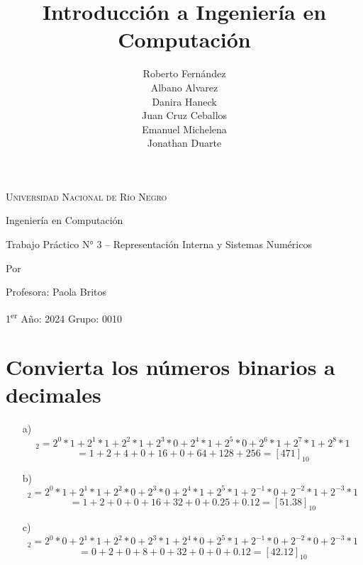 \documentclass{article}
\title{Introducción a Ingeniería en Computación}
\author{Roberto Fernández \\ Albano Alvarez \\ Danira Haneck \\ Juan Cruz Ceballos \\ Emanuel Michelena \\ Jonathan Duarte}
\date{}
\newcommand{\unrn}{\textsc{Universidad Nacional de Río Negro}}
\newcommand{\curso}{1\textsuperscript{er} Año: 2024 Grupo: 0010}
\newcommand{\profesor}{Profesora: Paola Britos}
\newcommand{\paperdesc}{Trabajo Práctico N° 3 – Representación Interna y Sistemas Numéricos}
\begin{document}
\begin{titlingpage}
    \begin{center}
        \vspace*{2cm}
        {\LARGE \unrn \par}
        \vspace{0.5cm}
        {\Large Ingeniería en Computación \par}
        \vspace{1.5cm}
        {\Large \thetitle \par}
        \vspace{1.5cm}
        {\Large \paperdesc \par}
        \vspace{2cm}
        {\Large Por \par}
        \vspace{0.5cm}
        {\large \theauthor \par}
        \vspace{2cm}
        {\Large \profesor \par}
        \vspace{0.5cm}
        {\Large \curso \par}
    \end{center}
\end{titlingpage}

\section{Convierta los números binarios a decimales}

\begin{enumerate}
    \item[a)] \begin{equation*} [111010111]_{2} = 2^{0} * 1 + 2^{1} * 1 + 2^{2} * 1 + 2^{3} * 0 + 2^{4} * 1 + 2^{5} * 0 + 2^{6} * 1 + 2^{7} * 1 + 2^{8} * 1\end{equation*} \begin{equation*} = 1 + 2 + 4 + 0 + 16 + 0 + 64 + 128 + 256 = [471]_{10}\end{equation*}
    \item[b)]  \begin{equation*} [110011.011]_{2} = 2^{0} * 1 + 2^{1} * 1 + 2^{2} * 0 + 2^{3} * 0 + 2^{4} * 1 + 2^{5} * 1 + 2^{-1} * 0 + 2^{-2} * 1 + 2^{-3} * 1\end{equation*} \begin{equation*} = 1 + 2 + 0 + 0 + 16 + 32 + 0 + 0.25 + 0.12 = [51.38]_{10}\end{equation*}
    \item[c)]  \begin{equation*} [101010.001]_{2} = 2^{0} * 0 + 2^{1} * 1 + 2^{2} * 0 + 2^{3} * 1 + 2^{4} * 0 + 2^{5} * 1 + 2^{-1} * 0 + 2^{-2} * 0 + 2^{-3} * 1\end{equation*} \begin{equation*} = 0 + 2 + 0 + 8 + 0 + 32 + 0 + 0 + 0.12 = [42.12]_{10}\end{equation*}
\end{enumerate}
\end{document}

